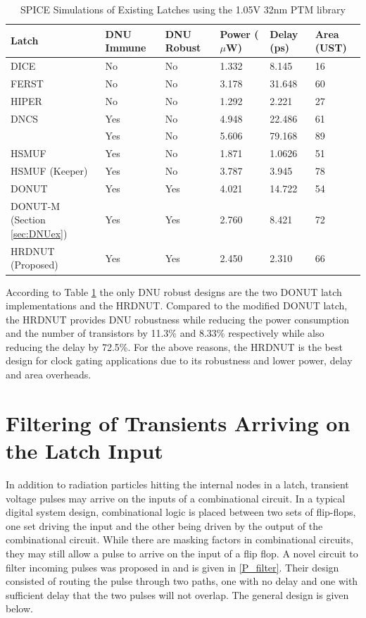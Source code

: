 \begin{table}[h]
	\begin{center}
		\caption{SPICE Simulations of Existing Latches using the 1.05V 32nm PTM library }
		\label{table:rtable}
		\begin{tabular}{|m{8em}|m{5em}|m{5em}|m{3em}|m{3em}|m{3em}|}
			\hline
			Latch & DNU Immune & DNU Robust & Power ($\mu$W) & Delay (ps) & Area (UST)\\ 
			\hline
			DICE & No & No & 1.332 & 8.145 & 16 \\
			\hline
			FERST & No & No & 3.178 & 31.648 & 60 \\
			\hline
			HIPER & No & No & 1.292 & 2.221 & 27 \\
			\hhline{|=|=|=|=|=|=|}
			DNCS & Yes & No & 4.948 & 22.486 & 61 \\
			\hline
			\cite{Inter} & Yes & No & 5.606 & 79.168 & 89 \\
			\hline
			HSMUF & Yes & No & 1.871 & 1.0626 & 51 \\
			\hline
			HSMUF (Keeper) & Yes & No & 3.787 & 3.945 & 78 \\
			\hhline{|=|=|=|=|=|=|}
			DONUT \cite{DONUT} & Yes & Yes & 4.021 & 14.722 & 54 \\ 
			\hline
			DONUT-M \newline (Section \ref{sec:DNUex}) & Yes & Yes & 2.760 & 8.421 & 72\\
			\hline
			HRDNUT \newline (Proposed) & Yes & Yes & 2.450 & 2.310 & 66 \\
			\hline
		\end{tabular}
	\end{center}
\end{table}

According to Table \ref{table:rtable} the only DNU robust designs are the two DONUT latch implementations and the HRDNUT. Compared to the modified DONUT latch, the HRDNUT provides DNU robustness while reducing the power consumption and the number of transistors by 11.3\% and 8.33\% respectively while also reducing the delay by 72.5\%. For the above reasons, the HRDNUT is the best design for clock gating applications due to its robustness and lower power, delay and area overheads.

\section{Filtering of Transients Arriving on the Latch Input}
In addition to radiation particles hitting the internal nodes in a latch, transient voltage pulses may arrive on the inputs of a combinational circuit. In a typical digital system design, combinational logic is placed between two sets of flip-flops, one set driving the input and the other being driven by the output of the combinational circuit. While there are masking factors in combinational circuits, they may still allow a pulse to arrive on the input of a flip flop. A novel circuit to filter incoming pulses was proposed in \cite{FERST} and is given in \ref{P_filter}. Their design consisted of routing the pulse through two paths, one with no delay and one with sufficient delay that the two pulses will not overlap. The general design is given below.

